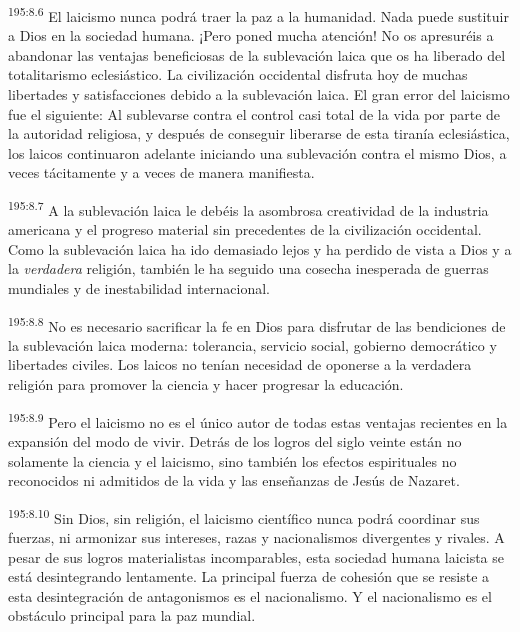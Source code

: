 \par
\textsuperscript{195:8.6} El laicismo nunca podrá traer la paz a la humanidad. Nada puede sustituir a Dios en la sociedad humana. ¡Pero poned mucha atención! No os apresuréis a abandonar las ventajas beneficiosas de la sublevación laica que os ha liberado del totalitarismo eclesiástico. La civilización occidental disfruta hoy de muchas libertades y satisfacciones debido a la sublevación laica. El gran error del laicismo fue el siguiente: Al sublevarse contra el control casi total de la vida por parte de la autoridad religiosa, y después de conseguir liberarse de esta tiranía eclesiástica, los laicos continuaron adelante iniciando una sublevación contra el mismo Dios, a veces tácitamente y a veces de manera manifiesta.

\par
\textsuperscript{195:8.7} A la sublevación laica le debéis la asombrosa creatividad de la industria americana y el progreso material sin precedentes de la civilización occidental. Como la sublevación laica ha ido demasiado lejos y ha perdido de vista a Dios y a la \textit{verdadera} religión, también le ha seguido una cosecha inesperada de guerras mundiales y de inestabilidad internacional.

\par
\textsuperscript{195:8.8} No es necesario sacrificar la fe en Dios para disfrutar de las bendiciones de la sublevación laica moderna: tolerancia, servicio social, gobierno democrático y libertades civiles. Los laicos no tenían necesidad de oponerse a la verdadera religión para promover la ciencia y hacer progresar la educación.

\par
\textsuperscript{195:8.9} Pero el laicismo no es el único autor de todas estas ventajas recientes en la expansión del modo de vivir. Detrás de los logros del siglo veinte están no solamente la ciencia y el laicismo, sino también los efectos espirituales no reconocidos ni admitidos de la vida y las enseñanzas de Jesús de Nazaret.

\par
\textsuperscript{195:8.10} Sin Dios, sin religión, el laicismo científico nunca podrá coordinar sus fuerzas, ni armonizar sus intereses, razas y nacionalismos divergentes y rivales. A pesar de sus logros materialistas incomparables, esta sociedad humana laicista se está desintegrando lentamente. La principal fuerza de cohesión que se resiste a esta desintegración de antagonismos es el nacionalismo. Y el nacionalismo es el obstáculo principal para la paz mundial.

